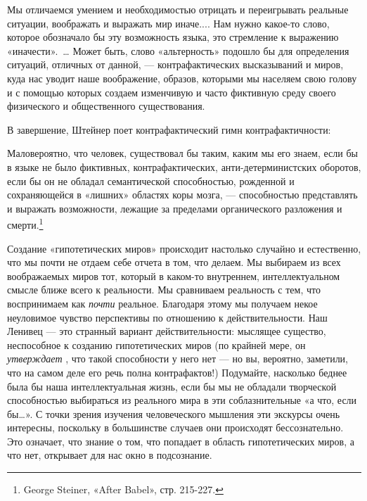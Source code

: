 \documentclass[../main.tex]{subfiles}
\begin{document}
Мы отличаемся умением и необходимостью отрицать и переигрывать реальные ситуации, воображать и выражать мир иначе.... Нам нужно какое-то слово, которое обозначало бы эту возможность языка, это стремление к выражению «иначести».~\ldots{} Может быть, слово «альтерность» подошло бы для определения ситуаций, отличных от данной, --- контрафактических высказываний и миров, куда нас уводит наше воображение, образов, которыми мы населяем свою голову и с помощью которых создаем изменчивую и часто фиктивную среду своего физического и общественного существования.

В завершение, Штейнер поет контрафактический гимн контрафактичности:

Маловероятно, что человек, существовал бы таким, каким мы его знаем, если бы в языке не было фиктивных, контрафактических, анти-детерминистских оборотов, если бы он не обладал семантической способностью, рожденной и сохраняющейся в «лишних» областях коры мозга, --- способностью представлять и выражать возможности, лежащие за пределами органического разложения и смерти.\footnote{George Steiner, «After Babel», стр. 215-227.}

Создание «гипотетических миров» происходит настолько случайно и естественно, что мы почти не отдаем себе отчета в том, что делаем. Мы выбираем из всех воображаемых миров тот, который в каком-то внутреннем, интеллектуальном смысле ближе всего к реальности. Мы сравниваем реальность с тем, что воспринимаем как \emph{почти} реальное. Благодаря этому мы получаем некое неуловимое чувство перспективы по отношению к действительности. Наш Ленивец --- это странный вариант действительности: мыслящее существо, неспособное к созданию гипотетических миров (по крайней мере, он \emph{утверждает} , что такой способности у него нет --- но вы, вероятно, заметили, что на самом деле его речь полна контрафактов!) Подумайте, насколько беднее была бы наша интеллектуальная жизнь, если бы мы не обладали творческой способностью выбираться из реального мира в эти соблазнительные «а что, если бы\ldots». С точки зрения изучения человеческого мышления эти экскурсы очень интересны, поскольку в большинстве случаев они происходят бессознательно. Это означает, что знание о том, что попадает в область гипотетических миров, а что нет, открывает для нас окно в подсознание.
\end{document}
